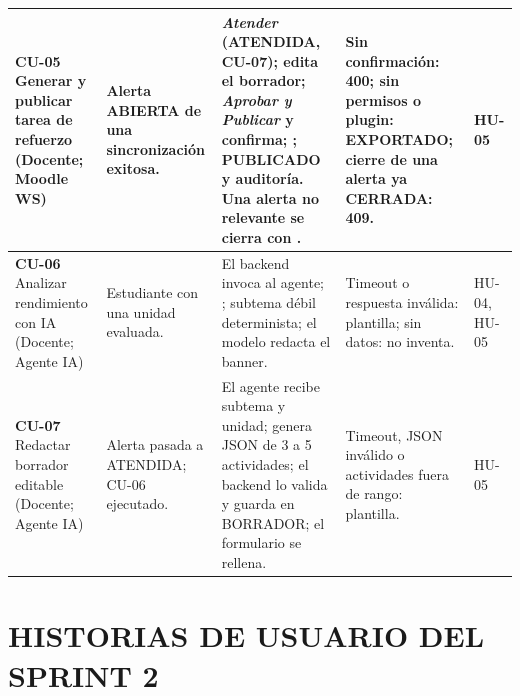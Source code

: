 \documentclass[11pt,a4paper]{article}
\begin{document}
\begin{longtable}{|R{2.8cm}|R{2.3cm}|R{4.6cm}|R{3.2cm}|R{1.0cm}|}
\footnotesize \textbf{CU-05} Generar y publicar tarea de refuerzo (Docente; Moodle WS) & \footnotesize Alerta ABIERTA de una sincronización exitosa. & \footnotesize \emph{Atender} (ATENDIDA, CU-07); edita el borrador; \emph{Aprobar y Publicar} y confirma; ; PUBLICADO y auditoría. Una alerta no relevante se cierra con . & \footnotesize Sin confirmación: 400; sin permisos o plugin: EXPORTADO; cierre de una alerta ya CERRADA: 409. & \footnotesize HU-05\\ \hline
\footnotesize \textbf{CU-06} Analizar rendimiento con IA (Docente; Agente IA) & \footnotesize Estudiante con una unidad evaluada. & \footnotesize El backend invoca al agente; ; subtema débil determinista; el modelo redacta el banner. & \footnotesize Timeout o respuesta inválida: plantilla; sin datos: no inventa. & \footnotesize HU-04, HU-05\\ \hline
\footnotesize \textbf{CU-07} Redactar borrador editable (Docente; Agente IA) & \footnotesize Alerta pasada a ATENDIDA; CU-06 ejecutado. & \footnotesize El agente recibe subtema y unidad; genera JSON de 3 a 5 actividades; el backend lo valida y guarda en BORRADOR; el formulario se rellena. & \footnotesize Timeout, JSON inválido o actividades fuera de rango: plantilla. & \footnotesize HU-05\\ \hline
\end{longtable}

\section{HISTORIAS DE USUARIO DEL SPRINT 2}
\end{document}
